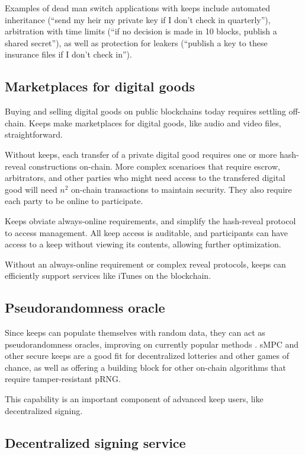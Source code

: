 \documentclass[11pt]{article}
\begin{document}
Examples of dead man switch applications with keeps include automated
inheritance (“send my heir my private key if I don’t check in
quarterly”), arbitration with time limits (“if no decision is made in
10 blocks, publish a shared secret”), as well as protection for
leakers (“publish a key to these insurance files if I don’t check
in”).

\subsection{Marketplaces for digital goods}

Buying and selling digital goods on public blockchains today requires
settling off-chain. Keeps make marketplaces for digital goods, like
audio and video files, straightforward.

Without keeps, each transfer of a private digital good requires one or
more hash-reveal constructions on-chain. More complex scenarioes
that require escrow, arbitrators, and other parties who might need
access to the transfered digital good will need ${n^2}$ on-chain
transactions to maintain security. They also require each party to be
online to participate.

Keeps obviate always-online requirements, and simplify the hash-reveal
protocol to access management. All keep access is auditable, and
participants can have access to a keep without viewing its contents,
allowing further optimization.

Without an always-online requirement or complex reveal protocols,
keeps can efficiently support services like iTunes on the blockchain.

\subsection{Pseudorandomness oracle}

Since keeps can populate themselves with random data, they can act as
pseudorandomness oracles, improving on currently popular methods
\cite{prngStackexchange}. sMPC and other secure keeps are a good fit for
decentralized lotteries and other games of chance, as well as offering
a building block for other on-chain algorithms that require
tamper-resistant pRNG.

This capability is an important component of advanced keep users, like
decentralized signing.

\subsection{Decentralized signing service}
\end{document}
